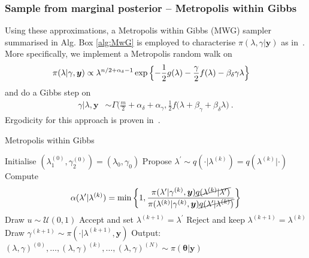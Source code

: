 \subsubsection{Sample from marginal posterior -- Metropolis within Gibbs}
\label{subsec:MWG}
Using these approximations, a Metropolis within Gibbs (MWG) sampler summarised in Alg. Box \ref{alg:MwG} is employed to characterise $\pi(\lambda,\gamma|\bm{y})$ as in~\cite{fox2016fast}.
More specifically, we implement a Metropolis random walk on
\begin{align}
	\label{eq:margApplCondGam}
	\pi(\lambda | \gamma, \bm{y}) &\propto \lambda^{n/2 +\alpha_{\delta}-1} \exp{\Bigl\{ - \frac{1}{2} g ( \lambda) - \frac{\gamma}{2} f ( \lambda) - \beta_\delta \gamma \lambda \Bigr\}}
\end{align} 
and do a Gibbs step on
\begin{align}
	\gamma |  \lambda, \bm{y} &\sim \Gamma \bigg( \frac{m}{2} + \alpha_\delta + \alpha_\gamma, \frac{1}{2} f (\lambda + \beta_\gamma + \beta_\delta \lambda \bigg)\label{eq:GibbsStep} \ .
\end{align} 
Ergodicity for this approach is proven in~\cite{roberts2006harris}.

\begin{algorithm}[!ht]
	\caption{Metropolis within Gibbs}
	\begin{algorithmic}[1]
		\STATE Initialise \( ( \lambda_1^{(0)} , \gamma_2^{(0)}  )= ( \lambda_{0} , \gamma_{0}  )  \)
		\STATE Propose \( \lambda^{\prime} \sim q(\cdot   | \lambda^{(k)}) = q(\lambda^{(k)} |\cdot  ) \)
		\STATE Compute
		\[ \alpha( \lambda^{\prime} | \lambda^{(k)}) = \min \left\{ 1, \frac{\pi(\lambda^{\prime}  | \gamma^{(k)}, \bm{y}) \cancel{q(\lambda^{(k)} | \lambda^{\prime} ) } }{\pi(\lambda^{(k)} | \gamma^{(k)}, \bm{y}) \cancel{q(\lambda^{\prime} | \lambda^{(k)})} } \right\} \]
		\STATE Draw $u \sim \mathcal{U}(0,1)$
		\STATE Accept and set \( \lambda^{(k+1)} = \lambda^{\prime} \)
		\ELSE  
		\STATE Reject and keep \(\lambda^{(k+1)} = \lambda^{(k)} \)
		\ENDIF
		\STATE Draw \(\gamma^{(k+1)} \sim  \pi( \cdot | \lambda^{(k+1)} , \bm{y} )\) 
		\ENDFOR
		\STATE Output: $ (\lambda,\gamma)^{(0)}, \dots,  (\lambda,\gamma)^{(k)} , \dots,   (\lambda,\gamma)^{(N)} \sim \pi(\bm{\theta}| \bm{y}) $
	\end{algorithmic}
	\label{alg:MwG}
\end{algorithm}


